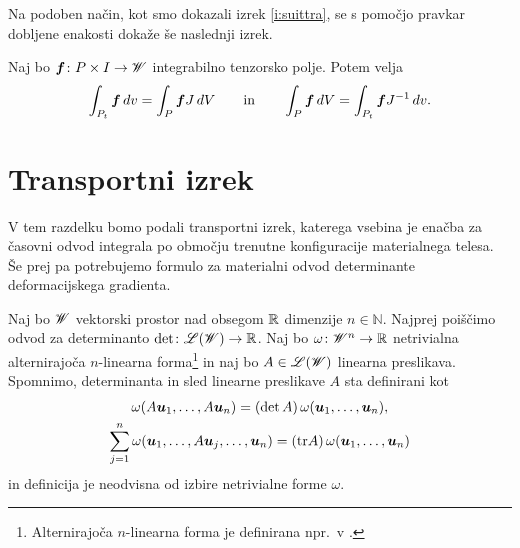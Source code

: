Na podoben način, kot smo dokazali izrek \ref{i:suittra}, se s pomočjo pravkar dobljene
enakosti dokaže še naslednji izrek.
\begin{izrek} \label{i:prointrel}
	Naj bo $\boldsymbol f\colon P\times I\to\mathscr W$ integrabilno tenzorsko polje. Potem velja
	\begin{equation*}
		\int_{P_t}\boldsymbol f\,dv=\int_P\boldsymbol fJ\,dV \qquad\textrm{in}\qquad
		\int_P\boldsymbol f\,dV=\int_{P_t}\boldsymbol fJ^{-1}\,dv.
	\end{equation*}
\end{izrek}


\section{Transportni izrek}


V tem razdelku bomo podali transportni izrek, katerega vsebina je
enačba za časovni odvod integrala po območju trenutne konfiguracije materialnega telesa.
Še prej pa potrebujemo formulo za materialni odvod determinante deformacijskega gradienta.

Naj bo $\mathscr W$ vektorski prostor nad obsegom $\mathbb R$ dimenzije $n\in\mathbb{N}$.
Najprej poiščimo odvod za determinanto $\det\colon\mathscr L(\mathscr W)\to\mathbb R$.
Naj bo $\omega\colon \mathscr W^n\to\mathbb R$ netrivialna alternirajoča $n$-linearna forma\footnote{
Alternirajoča $n$-linearna forma je definirana npr.~v \cite[str.~246]{liu}.}
in naj bo $A\in\mathscr L(\mathscr W)$ linearna preslikava.
Spomnimo, determinanta in sled linearne preslikave $A$ sta definirani kot
\begin{gather*}
	\omega(A\boldsymbol u_1,\dots,A\boldsymbol u_n)=(\det A)\,\omega(\boldsymbol u_1,\dots,\boldsymbol u_n), \\
	\sum_{j=1}^n\omega(\boldsymbol u_1,\dots,A\boldsymbol u_j,\dots,\boldsymbol u_n)=(\mathrm{tr} A)\,\omega(\boldsymbol u_1,\dots,\boldsymbol u_n)
\end{gather*}
in definicija je neodvisna od izbire netrivialne forme $\omega$.

